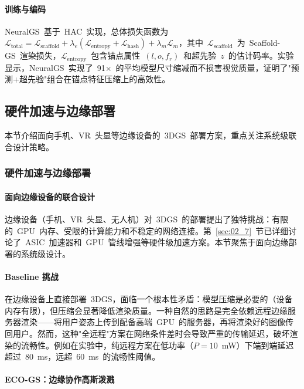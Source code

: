 \paragraph{训练与编码}

NeuralGS~基于~HAC~实现，总体损失函数为~$\mathcal{L}_\text{total} = \mathcal{L}_\text{scaffold} + \lambda_e(\mathcal{L}_\text{entropy} + \mathcal{L}_\text{hash}) + \lambda_m \mathcal{L}_m$，其中~$\mathcal{L}_\text{scaffold}$~为~Scaffold-GS~渲染损失，$\mathcal{L}_\text{entropy}$~包含锚点属性~$(l, o, f_r)$~和超先验~$z$~的估计码率。实验显示，NeuralGS~实现了~91$\times$~的平均模型尺寸缩减而不损害视觉质量，证明了"预测+超先验"组合在锚点特征压缩上的高效性。

\subsection{硬件加速与边缘部署}
\label{ss:11_6b}

本节介绍面向手机、VR~头显等边缘设备的~3DGS~部署方案，重点关注系统级联合设计策略。

\subsubsection{硬件加速与边缘部署}

\paragraph{面向边缘设备的联合设计}

边缘设备（手机、VR~头显、无人机）对~3DGS~的部署提出了独特挑战：有限的~GPU~内存、受限的计算能力和不稳定的网络连接。第~\ref{sec:02_7}~节已详细讨论了~ASIC~加速器和~GPU~管线增强等硬件级加速方案。本节聚焦于面向边缘部署的系统级设计。

\paragraph{Baseline 挑战}

在边缘设备上直接部署~3DGS，面临一个根本性矛盾：模型压缩是必要的（设备内存有限），但压缩会显著降低渲染质量。一种自然的思路是完全依赖远程边缘服务器渲染——将用户姿态上传到配备高端~GPU~的服务器，再将渲染好的图像传回用户。然而，这种"全远程"方案在网络条件差时会导致严重的传输延迟，破坏渲染的流畅性。例如在实验中，纯远程方案在低功率（$P=10$~mW）下端到端延迟超过~80~ms，远超~60~ms~的流畅性阈值。

\paragraph{ECO-GS：边缘协作高斯泼溅}

